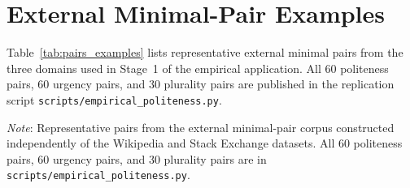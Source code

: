 \documentclass[11pt]{article}
\newcommand{\TableStyle}{\small\setlength{\tabcolsep}{5pt}\renewcommand{\arraystretch}{1.05}}
\begin{document}
\section{External Minimal-Pair Examples}\label{app:pairs}

Table~\ref{tab:pairs_examples} lists representative external minimal pairs from the three domains used in Stage~1 of the empirical application. All 60 politeness pairs, 60 urgency pairs, and 30 plurality pairs are published in the replication script \texttt{scripts/empirical\_politeness.py}.

\begin{table}[htbp]
\centering\TableStyle
\caption{Representative external minimal pairs used in Stage 1.}
\label{tab:pairs_examples}
\begin{minipage}{0.95\linewidth}\footnotesize
\emph{Note}: Representative pairs from the external minimal-pair corpus constructed independently of the Wikipedia and Stack Exchange datasets. All 60 politeness pairs, 60 urgency pairs, and 30 plurality pairs are in \texttt{scripts/empirical\_politeness.py}.
\end{minipage}
\end{table}
\end{document}
